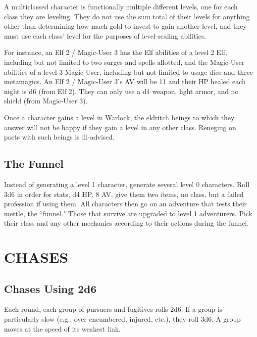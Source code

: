\documentclass[twoside]{article}
\begin{document}
\bigbreak

A multiclassed character is functionally multiple different levels, one for each class they are leveling. They do not use the sum total of their levels for anything other than determining how much gold to invest to gain another level, and they must use each class' level for the purposes of level-scaling abilities.

\bigbreak

For instance, an Elf 2 / Magic-User 3 has the Elf abilities of a level 2 Elf, including but not limited to two surges and spells allotted, and the Magic-User abilities of a level 3 Magic-User, including but not limited to usage dice and three metamagics. An Elf 2 / Magic-User 3's AV will be 11 and their HP healed each night is d6 (from Elf 2). They can only use a d4 weapon, light armor, and no shield (from Magic-User 3).

\bigbreak

Once a character gains a level in Warlock, the eldritch beings to which they answer will not be happy if they gain a level in any other class. Reneging on pacts with such beings is ill-advised.

\subsection*{The Funnel}

Instead of generating a level 1 character, generate several level 0 characters. Roll 3d6 in order for stats, d4 HP, 8 AV, give them two items, no class, but a failed profession if using them. All characters then go on an adventure that tests their mettle, the ``funnel." Those that survive are upgraded to level 1 adventurers. Pick their class and any other mechanics according to their actions during the funnel.

\section*{CHASES}

\subsection*{Chases Using 2d6}

Each round, each group of pursuers and fugitives rolls 2d6. If a group is particularly slow (e.g., over encumbered, injured, etc.), they roll 3d6. A group moves at the speed of its weakest link.
\end{document}
